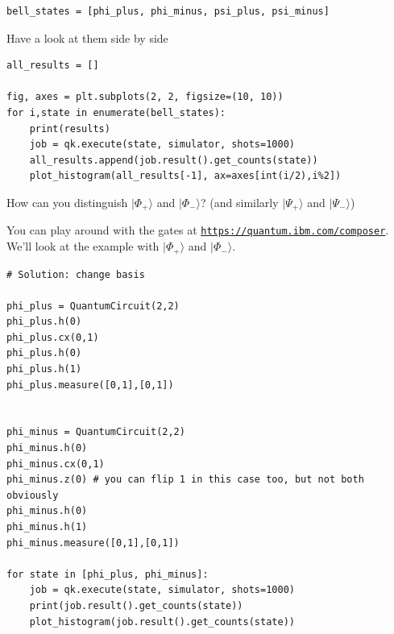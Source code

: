 \documentclass{beamer}
\begin{document}
\begin{frame}
\begin{verbatim}
bell_states = [phi_plus, phi_minus, psi_plus, psi_minus]

\end{verbatim}

Have a look at them side by side









\begin{verbatim}
all_results = []

fig, axes = plt.subplots(2, 2, figsize=(10, 10))
for i,state in enumerate(bell_states):
    print(results)
    job = qk.execute(state, simulator, shots=1000)
    all_results.append(job.result().get_counts(state))
    plot_histogram(all_results[-1], ax=axes[int(i/2),i%2])

\end{verbatim}


How can you distinguish $|\Phi_+\rangle$ and $|\Phi_-\rangle$? (and
similarly $|\Psi_+\rangle$ and $|\Psi_-\rangle$)

You can play around with the gates at \href{{https://quantum.ibm.com/composer}}{\nolinkurl{https://quantum.ibm.com/composer}}.
We'll look at the example with $|\Phi_+\rangle$ and $|\Phi_-\rangle$.
























\begin{verbatim}
# Solution: change basis

phi_plus = QuantumCircuit(2,2)
phi_plus.h(0)
phi_plus.cx(0,1)
phi_plus.h(0)
phi_plus.h(1)
phi_plus.measure([0,1],[0,1])


phi_minus = QuantumCircuit(2,2)
phi_minus.h(0)
phi_minus.cx(0,1)
phi_minus.z(0) # you can flip 1 in this case too, but not both obviously
phi_minus.h(0)
phi_minus.h(1)
phi_minus.measure([0,1],[0,1])

for state in [phi_plus, phi_minus]:
    job = qk.execute(state, simulator, shots=1000)
    print(job.result().get_counts(state))
    plot_histogram(job.result().get_counts(state))

\end{verbatim}
\end{frame}
\end{document}
